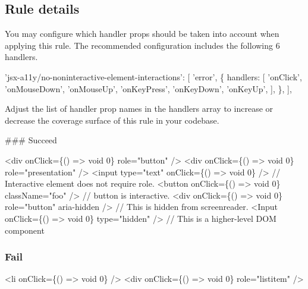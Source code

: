 \subsection*{Rule details}

You may configure which handler props should be taken into account when applying this rule. The recommended configuration includes the following 6 handlers.


\begin{DoxyCode}
'jsx-a11y/no-noninteractive-element-interactions': [
  'error',
  \{
    handlers: [
      'onClick',
      'onMouseDown',
      'onMouseUp',
      'onKeyPress',
      'onKeyDown',
      'onKeyUp',
    ],
  \},
],
\end{DoxyCode}


Adjust the list of handler prop names in the handlers array to increase or decrease the coverage surface of this rule in your codebase.

\#\#\# Succeed 
\begin{DoxyCode}
<div onClick=\{() => void 0\} role="button" />
<div onClick=\{() => void 0\} role="presentation" />
<input type="text" onClick=\{() => void 0\} /> // Interactive element does not require role.
<button onClick=\{() => void 0\} className="foo" /> // button is interactive.
<div onClick=\{() => void 0\} role="button" aria-hidden /> // This is hidden from screenreader.
<Input onClick=\{() => void 0\} type="hidden" /> // This is a higher-level DOM component
\end{DoxyCode}


\subsubsection*{Fail}


\begin{DoxyCode}
<li onClick=\{() => void 0\} />
<div onClick=\{() => void 0\} role="listitem" />
\end{DoxyCode}
 